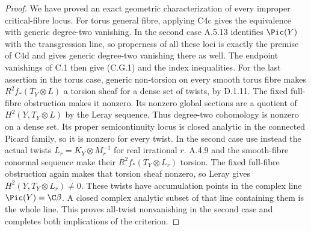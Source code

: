 \begin{proof}
We have proved an exact geometric characterization of
every improper critical-fibre locus. For torus general
fibre, applying C4c gives the equivalence with generic
degree-two vanishing. In the second case A.5.13 identifies
$\Pic(Y)$ with the transgression line, so properness of
all these loci is exactly the premise of C4d and gives
generic degree-two vanishing there as well.
The endpoint vanishings of C.1 then give (C.G.1) and the
index inequalities.
For the last assertion in the torus case, generic non-torsion on every
smooth torus fibre makes $R^2f_*(T_Y\otimes L)$ a
torsion sheaf for a dense set of twists, by D.1.11.
The fixed full-fibre obstruction makes it nonzero.
Its nonzero global sections are a quotient of
$H^2(Y,T_Y\otimes L)$ by the Leray sequence.
Thus degree-two cohomology is nonzero on a dense set.
Its proper semicontinuity locus is closed analytic in
the connected Picard family, so it is nonzero for every
twist. In the second case use instead the actual twists
$L_r=K_Y\otimes M_r^{-1}$ for real irrational $r$.
A.4.9 and the smooth-fibre conormal sequence make their
$R^2f_*(T_Y\otimes L_r)$ torsion. The fixed full-fibre
obstruction again makes that torsion sheaf nonzero,
so Leray gives $H^2(Y,T_Y\otimes L_r)\ne0$.
These twists have accumulation points in the complex
line $\Pic(Y)=\C\beta$. A closed complex analytic subset
of that line containing them is the whole line.
This proves all-twist nonvanishing in the second case
and completes both implications of the criterion.
\end{proof}


